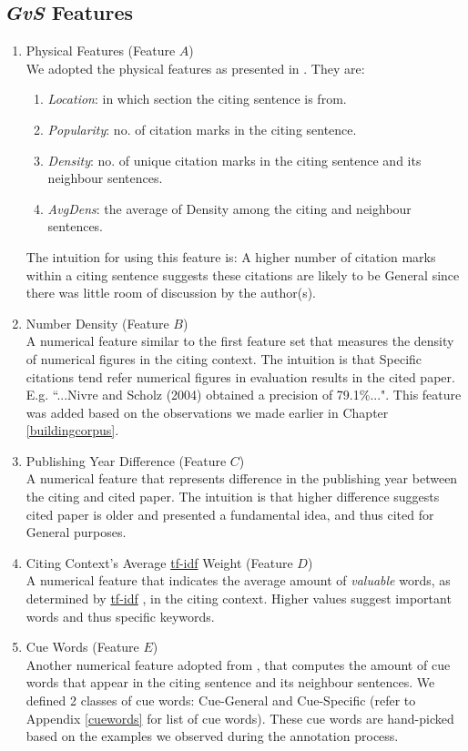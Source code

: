 \subsection*{{\it GvS} Features}
\begin{enumerate}
\item Physical Features (Feature $A$)\\
We adopted the physical features as presented in \cite{dongensemble}. They are:
\begin{enumerate}
\item \textit{Location}: in which section the citing sentence is from.
\item \textit{Popularity}: no. of citation marks in the citing sentence.
\item \textit{Density}: no. of unique citation marks in the citing sentence and its neighbour sentences.
\item \textit{AvgDens}: the average of Density among the citing and neighbour sentences.
\end{enumerate}
The intuition for using this feature is: A higher number of citation marks within a citing sentence suggests these citations are likely to be General since there was little room of discussion by the author(s).

\item Number Density (Feature $B$)\\
A numerical feature similar to the first feature set that measures the density of numerical figures in the citing context. The intuition is that Specific citations tend refer numerical figures in evaluation results in the cited paper. E.g. ``...Nivre and Scholz (2004) obtained a precision of 79.1\%...". This feature was added based on the observations we made earlier in Chapter \ref{buildingcorpus}.

\item Publishing Year Difference (Feature $C$)\\
A numerical feature that represents difference in the publishing year between the citing and cited paper. The intuition is that higher difference suggests cited paper is older and presented a fundamental idea, and thus cited for General purposes.

\item Citing Context's Average \url{tf-idf} Weight (Feature $D$)\\
A numerical feature that indicates the average amount of \textit{valuable} words, as determined by \url{tf-idf} \cite{irtextbook},  in the citing context. Higher values suggest important words and thus specific keywords.

\item Cue Words (Feature $E$)\\
Another numerical feature adopted from , that computes the amount of cue words that appear in the citing sentence and its neighbour sentences. We defined 2 classes of cue words: Cue-General and Cue-Specific (refer to Appendix \ref{cuewords} for list of cue words). These cue words are hand-picked based on the examples we observed during the annotation process.
\end{enumerate}

